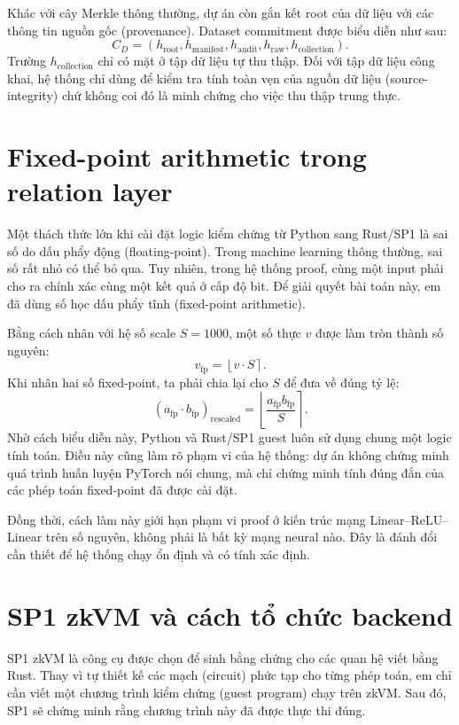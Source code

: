 \documentclass[12pt,a4paper,oneside]{report}
\begin{document}
Khác với cây Merkle thông thường, dự án còn gắn kết root của dữ liệu với các thông tin nguồn gốc (provenance). Dataset commitment được biểu diễn như sau:
\[
C_D = (h_{\text{root}}, h_{\text{manifest}}, h_{\text{audit}}, h_{\text{raw}}, h_{\text{collection}}).
\]
Trường \(h_{\text{collection}}\) chỉ có mặt ở tập dữ liệu tự thu thập. Đối với tập dữ liệu công khai, hệ thống chỉ dùng để kiểm tra tính toàn vẹn của nguồn dữ liệu (source-integrity) chứ không coi đó là minh chứng cho việc thu thập trung thực.

\section{Fixed-point arithmetic trong relation layer}

Một thách thức lớn khi cài đặt logic kiểm chứng từ Python sang Rust/SP1 là sai số do dấu phẩy động (floating-point). Trong machine learning thông thường, sai số rất nhỏ có thể bỏ qua. Tuy nhiên, trong hệ thống proof, cùng một input phải cho ra chính xác cùng một kết quả ở cấp độ bit. Để giải quyết bài toán này, em đã dùng số học dấu phẩy tĩnh (fixed-point arithmetic).

Bằng cách nhân với hệ số scale \(S = 1000\), một số thực \(v\) được làm tròn thành số nguyên:
\[
v_{\text{fp}} = \left\lfloor v \cdot S \right\rceil.
\]
Khi nhân hai số fixed-point, ta phải chia lại cho \(S\) để đưa về đúng tỷ lệ:
\[
(a_{\text{fp}} \cdot b_{\text{fp}})_{\text{rescaled}}
=
\left\lfloor \frac{a_{\text{fp}} b_{\text{fp}}}{S} \right\rceil.
\]
Nhờ cách biểu diễn này, Python và Rust/SP1 guest luôn sử dụng chung một logic tính toán. Điều này cũng làm rõ phạm vi của hệ thống: dự án không chứng minh quá trình huấn luyện PyTorch nói chung, mà chỉ chứng minh tính đúng đắn của các phép toán fixed-point đã được cài đặt.

Đồng thời, cách làm này giới hạn phạm vi proof ở kiến trúc mạng Linear--ReLU--Linear trên số nguyên, không phải là bất kỳ mạng neural nào. Đây là đánh đổi cần thiết để hệ thống chạy ổn định và có tính xác định.

\section{SP1 zkVM và cách tổ chức backend}

SP1 zkVM là công cụ được chọn để sinh bằng chứng cho các quan hệ viết bằng Rust. Thay vì tự thiết kế các mạch (circuit) phức tạp cho từng phép toán, em chỉ cần viết một chương trình kiểm chứng (guest program) chạy trên zkVM. Sau đó, SP1 sẽ chứng minh rằng chương trình này đã được thực thi đúng.
\end{document}
